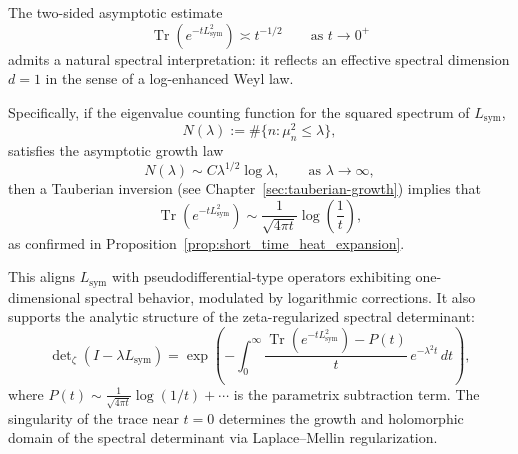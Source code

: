 \begin{remark}
\label{rem:spectral_dimension}
The two-sided asymptotic estimate
\[
\operatorname{Tr}(e^{-t L_{\mathrm{sym}}^2}) \asymp t^{-1/2} \qquad \text{as } t \to 0^+
\]
admits a natural spectral interpretation: it reflects an effective spectral dimension \( d = 1 \) in the sense of a log-enhanced Weyl law.

\medskip
\noindent
Specifically, if the eigenvalue counting function for the squared spectrum of \( L_{\mathrm{sym}} \),
\[
N(\lambda) := \#\{ n : \mu_n^2 \le \lambda \},
\]
satisfies the asymptotic growth law
\[
N(\lambda) \sim C \lambda^{1/2} \log \lambda, \qquad \text{as } \lambda \to \infty,
\]
then a Tauberian inversion (see Chapter~\ref{sec:tauberian-growth}) implies that
\[
\operatorname{Tr}(e^{-t L_{\mathrm{sym}}^2}) \sim \frac{1}{\sqrt{4\pi t}} \log\left( \frac{1}{t} \right),
\]
as confirmed in Proposition~\ref{prop:short_time_heat_expansion}.

\medskip
\noindent
This aligns \( L_{\mathrm{sym}} \) with pseudodifferential-type operators exhibiting one-dimensional spectral behavior, modulated by logarithmic corrections. It also supports the analytic structure of the zeta-regularized spectral determinant:
\[
\det\nolimits_\zeta(I - \lambda L_{\mathrm{sym}}) = \exp\left( - \int_0^\infty \frac{\operatorname{Tr}(e^{-t L_{\mathrm{sym}}^2}) - P(t)}{t} \, e^{-\lambda^2 t} \, dt \right),
\]
where \( P(t) \sim \frac{1}{\sqrt{4\pi t}} \log(1/t) + \cdots \) is the parametrix subtraction term. The singularity of the trace near \( t = 0 \) determines the growth and holomorphic domain of the spectral determinant via Laplace–Mellin regularization.
\end{remark}
